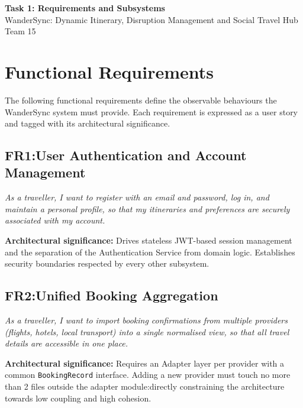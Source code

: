 \documentclass[12pt,a4paper]{article}
\begin{document}
\begin{center}
  {\LARGE\bfseries Task 1: Requirements and Subsystems}\\[0.4em]
  {\large WanderSync: Dynamic Itinerary, Disruption Management and Social Travel Hub}\\[0.2em]
  {\normalsize Team 15}
\end{center}

\vspace{1em}

\section{Functional Requirements}

The following functional requirements define the observable behaviours the WanderSync system must
provide. Each requirement is expressed as a user story and tagged with its architectural significance.

\subsection{FR1:User Authentication and Account Management}

\textit{As a traveller, I want to register with an email and password, log in, and maintain a personal
profile, so that my itineraries and preferences are securely associated with my account.}

\textbf{Architectural significance:} Drives stateless JWT-based session management and the separation
of the Authentication Service from domain logic. Establishes security boundaries respected by every
other subsystem.

\subsection{FR2:Unified Booking Aggregation}

\textit{As a traveller, I want to import booking confirmations from multiple providers (flights, hotels,
local transport) into a single normalised view, so that all travel details are accessible in one place.}

\textbf{Architectural significance:} Requires an Adapter layer per provider with a common
\texttt{BookingRecord} interface. Adding a new provider must touch no more than 2 files outside the
adapter module:directly constraining the architecture towards low coupling and high cohesion.
\end{document}
